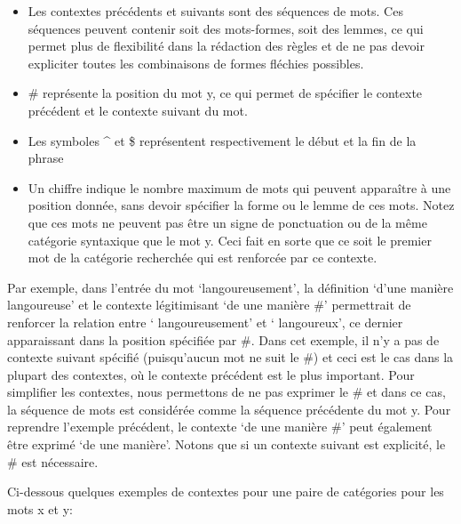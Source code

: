 \begin{itemize}
    \item{Les contextes précédents et suivants sont des séquences de mots. Ces 
    séquences peuvent contenir soit des mots-formes, soit des lemmes, ce qui 
    permet plus de flexibilité dans la rédaction des règles et de ne pas devoir 
    expliciter toutes les combinaisons de formes fléchies possibles.}

    \item{\# représente la position du mot y, ce qui permet de spécifier le 
    contexte précédent et le contexte suivant du mot.}

    \item{Les symboles \string^ et \$ représentent respectivement le début et 
    la fin de la phrase}

    \item{Un chiffre indique le nombre maximum de mots qui peuvent apparaître à 
    une position donnée, sans devoir spécifier la forme ou le lemme de ces mots. 
    Notez que ces mots ne peuvent pas être un signe de ponctuation ou de la 
    même catégorie syntaxique que le mot y. Ceci fait en sorte que ce soit 
    le premier mot de la catégorie recherchée qui est renforcée par ce 
    contexte.}

\end{itemize}

Par exemple, dans l'entrée du mot \lq{langoureusement}\rq{}, la définition 
\lq{d'une manière langoureuse}\rq{} et le contexte légitimisant \lq{de une manière 
\#}\rq{} permettrait de renforcer la relation entre \lq{} langoureusement\rq{} et \lq 
langoureux\rq{}, ce dernier apparaissant dans la position spécifiée par \#. Dans 
cet exemple, il n'y a pas de contexte suivant spécifié (puisqu'aucun mot ne suit 
le \#) et ceci est le cas dans la plupart des contextes, où le contexte 
précédent est le plus important. Pour simplifier les contextes, nous permettons 
de ne pas exprimer le \# et dans ce cas, la séquence de mots est considérée 
comme la séquence précédente du mot y. Pour reprendre l'exemple précédent, le 
contexte \lq{de une manière \#}\rq{} peut également être exprimé \lq{de une 
manière}\rq. Notons que si un contexte suivant est explicité, le \# est 
nécessaire.

Ci-dessous quelques exemples de contextes pour une paire de catégories pour les 
mots x et y:

